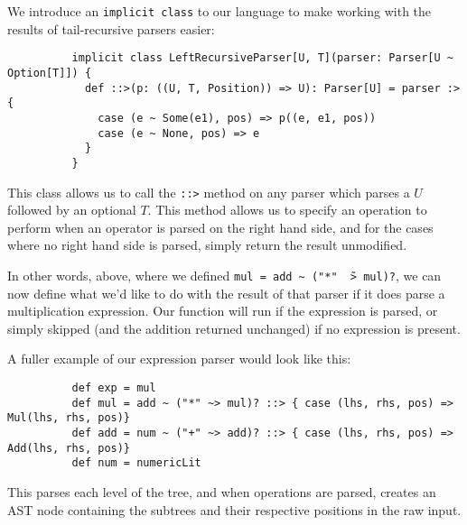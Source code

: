 \documentclass[british, twoside, openright]{bhamthesis}
\theoremstyle{definition}
\begin{document}
        We introduce an \texttt{implicit class} to our language to make working with the results of tail-recursive parsers easier:
        \begin{lstlisting}
          implicit class LeftRecursiveParser[U, T](parser: Parser[U ~ Option[T]]) {
            def ::>(p: ((U, T, Position)) => U): Parser[U] = parser :> {
              case (e ~ Some(e1), pos) => p((e, e1, pos))
              case (e ~ None, pos) => e
            }
          }
        \end{lstlisting}

        This class allows us to call the \texttt{::>} method on any parser which parses a $U$ followed by an optional $T$. This method allows us to specify an operation to perform when an operator is parsed on the right hand side, and for the cases where no right hand side is parsed, simply return the result unmodified.

        In other words, above, where we defined \texttt{mul = add \~~("*" \~\ > mul)?}, we can now define what we'd like to do with the result of that parser if it does parse a multiplication expression. Our function will run if the expression is parsed, or simply skipped (and the addition returned unchanged) if no expression is present.

        A fuller example of our expression parser would look like this:
        \begin{lstlisting}
          def exp = mul
          def mul = add ~ ("*" ~> mul)? ::> { case (lhs, rhs, pos) => Mul(lhs, rhs, pos)}
          def add = num ~ ("+" ~> add)? ::> { case (lhs, rhs, pos) => Add(lhs, rhs, pos)}
          def num = numericLit
        \end{lstlisting}
        This parses each level of the tree, and when operations are parsed, creates an AST node containing the subtrees and their respective positions in the raw input.
\end{document}
